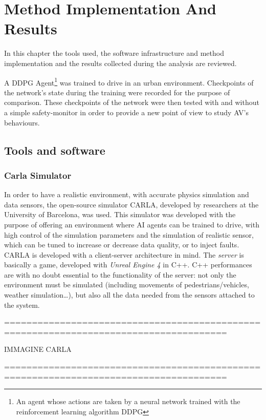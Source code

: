 \chapter{Method Implementation And Results}

In this chapter the tools used, the software infrastructure and method implementation and the results collected during the analysis are reviewed.

A DDPG Agent\footnote{An agent whose actions are taken by a neural network trained with the reinforcement learning algorithm DDPG} was trained to drive in an urban environment. Checkpoints of the network's state during the training were recorded for the purpose of comparison. These checkpoints of the network were then tested with and without a simple safety-monitor in order to provide a new point of view to study AV's behaviours.

\section{Tools and software}

\subsection{Carla Simulator}

In order to have a realistic environment, with accurate physics simulation and data sensors, the open-source simulator CARLA\cite{carla}, developed by researchers at the University of Barcelona, was used. This simulator was developed with the purpose of offering an environment where AI agents can be trained to drive, with high control of the simulation parameters and the simulation of realistic sensor, which can be tuned to increase or decrease data quality, or to inject faults.\newline
CARLA is developed with a client-server architecture in mind. The \textsl{server} is basically a game, developed with \textsl{Unreal Engine 4} in C++. C++ performances are with no doubt essential to the functionality of the server: not only the environment must be simulated (including movements of pedestrians/vehicles, weather simulation\dots), but also all the data needed from the sensors attached to the system.\newline


======================================================================================

IMMAGINE CARLA

======================================================================================

